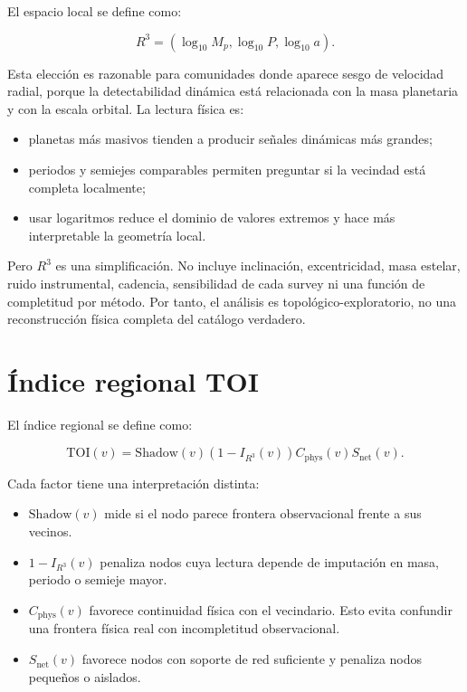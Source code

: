 \documentclass[11pt]{article}
\begin{document}
El espacio local se define como:

\[
R^3=(\log_{10}M_p,\log_{10}P,\log_{10}a).
\]

Esta elección es razonable para comunidades donde aparece sesgo de velocidad radial, porque la detectabilidad dinámica está relacionada con la masa planetaria y con la escala orbital. La lectura física es:

\begin{itemize}
    \item planetas más masivos tienden a producir señales dinámicas más grandes;
    \item periodos y semiejes comparables permiten preguntar si la vecindad está completa localmente;
    \item usar logaritmos reduce el dominio de valores extremos y hace más interpretable la geometría local.
\end{itemize}

Pero $R^3$ es una simplificación. No incluye inclinación, excentricidad, masa estelar, ruido instrumental, cadencia, sensibilidad de cada survey ni una función de completitud por método. Por tanto, el análisis es topológico-exploratorio, no una reconstrucción física completa del catálogo verdadero.

\section{Índice regional TOI}

El índice regional se define como:

\[
\mathrm{TOI}(v)=\mathrm{Shadow}(v)(1-I_{R^3}(v))C_{\mathrm{phys}}(v)S_{\mathrm{net}}(v).
\]

Cada factor tiene una interpretación distinta:

\begin{itemize}
    \item $\mathrm{Shadow}(v)$ mide si el nodo parece frontera observacional frente a sus vecinos.
    \item $1-I_{R^3}(v)$ penaliza nodos cuya lectura depende de imputación en masa, periodo o semieje mayor.
    \item $C_{\mathrm{phys}}(v)$ favorece continuidad física con el vecindario. Esto evita confundir una frontera física real con incompletitud observacional.
    \item $S_{\mathrm{net}}(v)$ favorece nodos con soporte de red suficiente y penaliza nodos pequeños o aislados.
\end{itemize}
\end{document}
